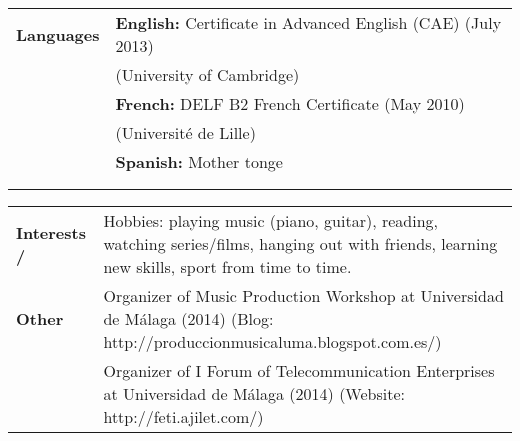 \documentclass[letterpaper,11pt,oneside]{article}
\begin{document}
\noindent \begin{tabularx}{\linewidth}{l X}
\Large{\textbf{Languages}}    & \textbf{English:} Certificate in Advanced English (CAE) (July 2013)\\
    & (University of Cambridge)\\
    & \textbf{French:} DELF B2 French Certificate (May 2010)\\
    & (Université de Lille)\\
    & \textbf{Spanish:} Mother tonge\\
    & \\
    \\
\end{tabularx}
\noindent \begin{tabularx}{\linewidth}{l X}
\Large{\textbf{Interests /}}    & Hobbies: playing music (piano, guitar), reading, watching series/films, hanging out with friends, learning new skills, sport from time to time.\\
\Large{\textbf{Other}}    & Organizer of Music Production Workshop at Universidad de Málaga (2014) (Blog: http://produccionmusicaluma.blogspot.com.es/)\\
    & Organizer of I Forum of Telecommunication Enterprises at Universidad de Málaga (2014) (Website: http://feti.ajilet.com/)
\end{tabularx}
\newpage
\end{document}
